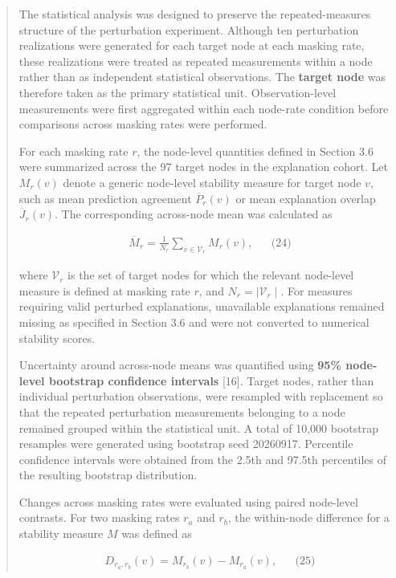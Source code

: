 \documentclass[a4paper]{article}
\begin{document}
\begin{quote}
The statistical analysis was designed to preserve the repeated-measures
structure of the perturbation experiment. Although ten perturbation
realizations were generated for each target node at each masking rate,
these realizations were treated as repeated measurements within a node
rather than as independent statistical observations. The \textbf{target
node} was therefore taken as the primary statistical unit.
Observation-level measurements were first aggregated within each
node-rate condition before comparisons across masking rates were
performed.

For each masking rate \(r\), the node-level quantities defined in
Section 3.6 were summarized across the 97 target nodes in the
explanation cohort. Let \(M_{r}(v)\) denote a generic node-level
stability measure for target node \(v\), such as mean prediction
agreement \({\overline{P}}_{r}(v)\) or mean explanation overlap
\({\overline{J}}_{r}(v)\). The corresponding across-node mean was
calculated as

\[\begin{matrix}
 & {\overline{M}}_{r} = \frac{1}{N_{r}}\sum_{v \in \mathcal{V}_{r}}^{}M_{r}(v), & & \text{(24)}
\end{matrix}
\]

where \(\mathcal{V}_{r}\) is the set of target nodes for which the
relevant node-level measure is defined at masking rate \(r\), and
\(N_{r} = \mid \mathcal{V}_{r} \mid\). For measures requiring valid
perturbed explanations, unavailable explanations remained missing as
specified in Section 3.6 and were not converted to numerical stability
scores.

Uncertainty around across-node means was quantified using \textbf{95\%
node-level bootstrap confidence intervals} {[}16{]}. Target nodes,
rather than individual perturbation observations, were resampled with
replacement so that the repeated perturbation measurements belonging to
a node remained grouped within the statistical unit. A total of 10,000
bootstrap resamples were generated using bootstrap seed 20260917.
Percentile confidence intervals were obtained from the 2.5th and 97.5th
percentiles of the resulting bootstrap distribution.

Changes across masking rates were evaluated using paired node-level
contrasts. For two masking rates \(r_{a}\) and \(r_{b}\), the
within-node difference for a stability measure \(M\) was defined as

\[\begin{matrix}
 & D_{r_{a},r_{b}}(v) = M_{r_{b}}(v) - M_{r_{a}}(v), & & \text{(25)}
\end{matrix}
\]


\end{quote}
\end{document}
